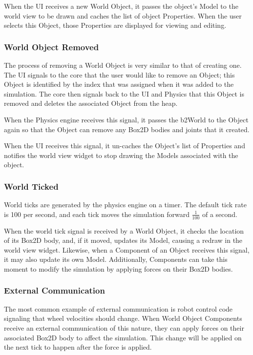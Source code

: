 	When the UI receives a new World Object, it passes the object's Model to the world view to be drawn and caches the list of object Properties. When the user selects this Object, those Properties are displayed for viewing and editing.
	
 \subsubsection{World Object Removed}
 The process of removing a World Object is very similar to that of creating one. The UI signals to the core that the user would like to remove an Object; this Object is identified by the index that was assigned when it was added to the simulation. The core then signals back to the UI and Physics that this Object is removed and deletes the associated Object from the heap.
 
 When the Physics engine receives this signal, it passes the b2World to the Object again so that the Object can remove any Box2D bodies and joints that it created.
 
 When the UI receives this signal, it un-caches the Object's list of Properties and notifies the world view widget to stop drawing the Models associated with the object.
 
 \subsubsection{World Ticked}
 World ticks are generated by the physics engine on a timer. The default tick rate is 100 per second, and each tick moves the simulation forward $\frac{1}{100}$ of a second.
 
 When the world tick signal is received by a World Object, it checks the location of its Box2D body, and, if it moved, updates its Model, causing a redraw in the world view widget. Likewise, when a Component of an Object receives this signal, it may also update its own Model. Additionally, Components can take this moment to modify the simulation by applying forces on their Box2D bodies.
 
 \subsubsection{External Communication}
 The most common example of external communication is robot control code signaling that wheel velocities should change. When World Object Components receive an external communication of this nature, they can apply forces on their associated Box2D body to affect the simulation. This change will be applied on the next tick to happen after the force is applied.
 
